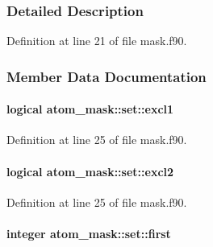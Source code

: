 \subsubsection{Detailed Description}


Definition at line 21 of file mask.\-f90.



\subsubsection{Member Data Documentation}
\hypertarget{structatom__mask_1_1set_acf2309b82239a42e0039317fc08a3937}{
\paragraph[{excl1}]{\setlength{\rightskip}{0pt plus 5cm}logical atom\-\_\-mask\-::set\-::excl1\hspace{0.3cm}{\ttfamily [private]}}}\label{structatom__mask_1_1set_acf2309b82239a42e0039317fc08a3937}


Definition at line 25 of file mask.\-f90.

\hypertarget{structatom__mask_1_1set_aa328cccd9326b8ac3f4ef1a094679c72}{
\paragraph[{excl2}]{\setlength{\rightskip}{0pt plus 5cm}logical atom\-\_\-mask\-::set\-::excl2\hspace{0.3cm}{\ttfamily [private]}}}\label{structatom__mask_1_1set_aa328cccd9326b8ac3f4ef1a094679c72}


Definition at line 25 of file mask.\-f90.

\hypertarget{structatom__mask_1_1set_ac6846c0279ec629afe32529292615f94}{
\paragraph[{first}]{\setlength{\rightskip}{0pt plus 5cm}integer atom\-\_\-mask\-::set\-::first\hspace{0.3cm}{\ttfamily [private]}}}\label{structatom__mask_1_1set_ac6846c0279ec629afe32529292615f94}



